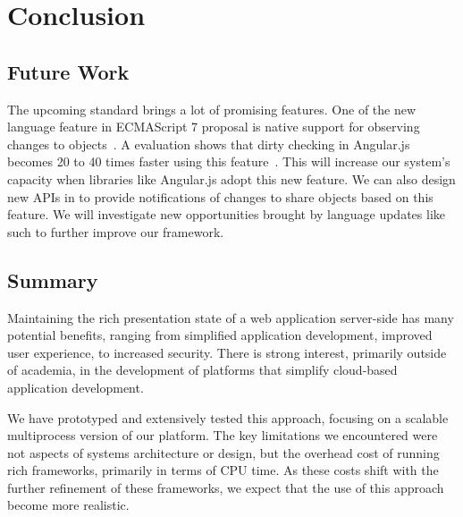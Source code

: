 \chapter{Conclusion}

\section{Future Work}

The upcoming \js standard brings a lot of promising features.  One of the new
language feature in ECMAScript 7 proposal is native support for observing
changes to objects~\cite{jsobserveprop}. A evaluation shows that dirty
checking in Angular.js becomes 20 to 40 times faster using this
feature~\cite{angularjsspeedup}. This will increase our system's capacity when
libraries like Angular.js  adopt this new feature. We can also design new APIs
in \appins to provide notifications of changes to share objects based on this
feature. We will investigate new opportunities brought by language updates
like such to further improve our framework.




\section{Summary}

Maintaining the rich presentation state  of a web application server-side has
many potential benefits, ranging from simplified application development,
improved user experience, to increased security.  There is strong interest,
primarily outside of academia, in the development of platforms that simplify
cloud-based  application development.

We have prototyped and extensively tested this approach, focusing on a
scalable multiprocess version of our \cb{} platform. The key limitations we
encountered were not aspects of systems architecture or design,  but the
overhead cost of running rich frameworks, primarily in terms of CPU time.   As
these costs shift with the further refinement of these frameworks, we expect
that the use of this approach become more realistic.
